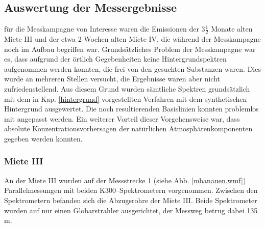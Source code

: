 \subsection{\label{auswmba}Auswertung der Messergebnisse}

für die Messkampagne von Interesse waren die Emissionen der $3
\frac{1}{2}$ Monate alten Miete III und der etwa 2 Wochen alten
Miete IV, die während der Messkampagne noch im Aufbau begriffen
war. Grundsätzliches Problem der Messkampagne war es, dass
aufgrund der örtlich Gegebenheiten keine Hintergrundspektren
aufgenommen werden konnten, die frei von den gesuchten Substanzen
waren. Dies wurde an mehreren Stellen versucht, die Ergebnisse
waren aber nicht zufriedenstellend. Aus diesem Grund wurden
sämtliche Spektren grundsätzlich mit dem in Kap. \ref{hintergrund}
vorgestellten Verfahren mit dem synthetischen Hintergrund
ausgewertet. Die noch resultierenden Basislinien konnten
problemlos mit angepasst werden. Ein weiterer Vorteil dieser
Vorgehensweise war, dass absolute Konzentrationsvorhersagen der
natürlichen Atmosphärenkomponenten gegeben werden konnten.\\




\subsubsection{\label{miete3} Miete III}


An der Miete III wurden auf der Messstrecke 1 (siehe Abb.
\ref{mbanauen.wmf}) Parallelmessungen mit beiden
K300--Spektrometern vorgenommen. Zwischen den Spektrometern
befanden sich die Abzugsrohre der Miete III. Beide Spektrometer
wurden auf nur einen Globarstrahler ausgerichtet, der Messweg
betrug dabei 135 m.\\

